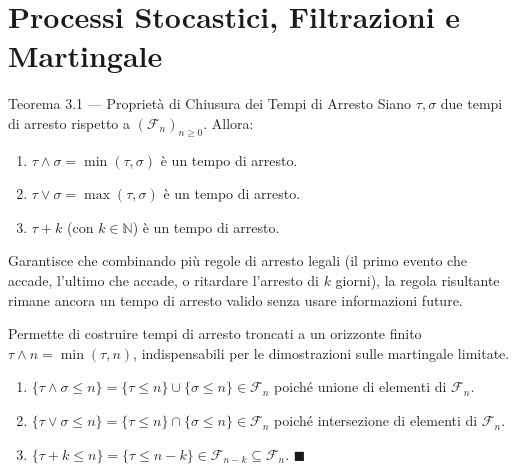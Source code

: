 \documentclass[11pt,a4paper]{report}
\newcommand{\F}{\mathcal{F}}
\newcommand{\1}{\mathbf{1}}
\begin{document}
\newpage

\chapter{Processi Stocastici, Filtrazioni e Martingale}

\begin{teoremabox}{Teorema 3.1 --- Proprietà di Chiusura dei Tempi di Arresto}
Siano $\tau, \sigma$ due tempi di arresto rispetto a $(\F_n)_{n \ge 0}$. Allora:
\begin{enumerate}
    \item $\tau \wedge \sigma = \min(\tau, \sigma)$ è un tempo di arresto.
    \item $\tau \vee \sigma = \max(\tau, \sigma)$ è un tempo di arresto.
    \item $\tau + k$ (con $k \in \mathbb{N}$) è un tempo di arresto.
\end{enumerate}
\end{teoremabox}

\begin{cosafa}
Garantisce che combinando più regole di arresto legali (il primo evento che accade, l'ultimo che accade, o ritardare l'arresto di $k$ giorni), la regola risultante rimane ancora un tempo di arresto valido senza usare informazioni future.
\end{cosafa}

\begin{acosaserve}
Permette di costruire tempi di arresto troncati a un orizzonte finito $\tau \wedge n = \min(\tau, n)$, indispensabili per le dimostrazioni sulle martingale limitate.
\end{acosaserve}

\begin{dimostrazione}
\begin{enumerate}
    \item $\{\tau \wedge \sigma \le n\} = \{\tau \le n\} \cup \{\sigma \le n\} \in \F_n$ poiché unione di elementi di $\F_n$.
    \item $\{\tau \vee \sigma \le n\} = \{\tau \le n\} \cap \{\sigma \le n\} \in \F_n$ poiché intersezione di elementi di $\F_n$.
    \item $\{\tau + k \le n\} = \{\tau \le n - k\} \in \F_{n-k} \subseteq \F_n$. $\blacksquare$
\end{enumerate}
\end{dimostrazione}
\end{document}
